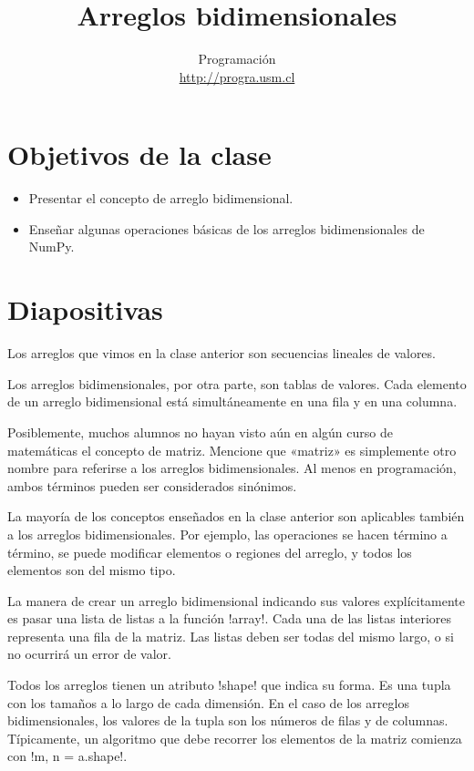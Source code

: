 \documentclass[10pt]{article}
\title{Arreglos bidimensionales}
\author{Programación \\ \url{http://progra.usm.cl}}
\date{}
\begin{document}
  \maketitle

  \section*{Objetivos de la clase}
  \begin{itemize}
    \item Presentar el concepto
      de arreglo bidimensional.
    \item Enseñar algunas operaciones básicas
      de los arreglos bidimensionales de NumPy.
  \end{itemize}

  \section*{Diapositivas}

  Los arreglos que vimos en la clase anterior
  son secuencias lineales de valores.

  Los arreglos bidimensionales, por otra parte,
  son tablas de valores.
  Cada elemento de un arreglo bidimensional
  está simultáneamente en una fila y en una columna.

  Posiblemente,
  muchos alumnos no hayan visto aún en algún curso de matemáticas
  el concepto de matriz.
  Mencione que «matriz» es simplemente otro nombre
  para referirse a los arreglos bidimensionales.
  Al menos en programación,
  ambos términos pueden ser considerados sinónimos.

  La mayoría de los conceptos enseñados en la clase anterior
  son aplicables también a los arreglos bidimensionales.
  Por ejemplo, las operaciones se hacen término a término,
  se puede modificar elementos o regiones del arreglo, y
  todos los elementos son del mismo tipo.


  La manera de crear un arreglo bidimensional
  indicando sus valores explícitamente
  es pasar una lista de listas
  a la función \li!array!.
  Cada una de las listas interiores
  representa una fila de la matriz.
  Las listas deben ser todas del mismo largo,
  o si no ocurrirá un error de valor.

  Todos los arreglos tienen un atributo \li!shape!
  que indica su forma.
  Es una tupla con los tamaños a lo largo de cada dimensión.
  En el caso de los arreglos bidimensionales,
  los valores de la tupla son los números de filas y de columnas.
  Típicamente,
  un algoritmo que debe recorrer los elementos de la matriz
  comienza con \li!m, n = a.shape!.
\end{document}
